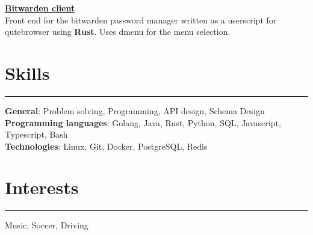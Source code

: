 \documentclass[11pt]{article}
\begin{document}
\href{https://github.com/narayanan-gokul/qute_userscript}{\textbf{Bitwarden client}} \\
Front end for the bitwarden password manager written as a userscript for 
qutebrowser using \textbf{Rust}. Uses dmenu for the menu selection.

\vspace{-0.5\baselineskip}
\section*{Skills}
\hrule
\textbf{General}: Problem solving, Programming, API design, Schema Design \\
\textbf{Programming languages}: Golang, Java, Rust, Python, SQL, Javascript,
Typescript, Bash \\
\textbf{Technologies}: Linux, Git, Docker, PostgreSQL, Redis

\vspace{-0.5\baselineskip}
\section*{Interests}
\hrule
Music, Soccer, Driving
\end{document}
